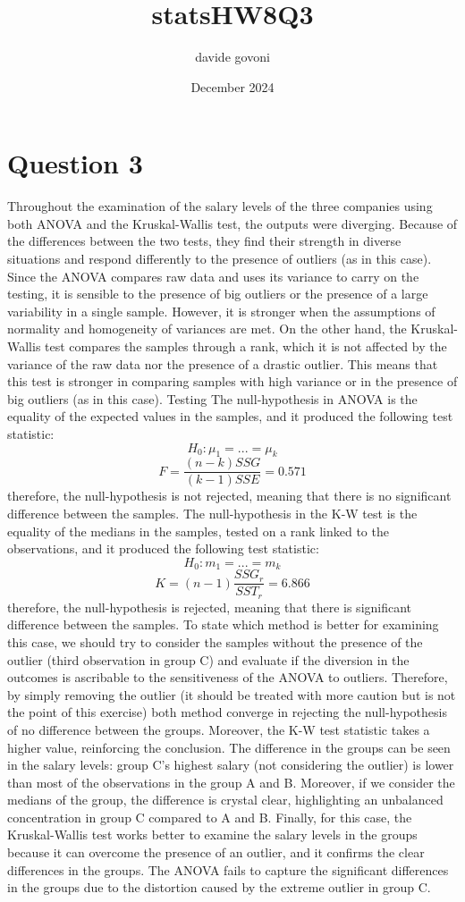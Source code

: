 \documentclass{article}
\title{statsHW8Q3}
\author{davide govoni}
\date{December 2024}
\begin{document}
\maketitle

\section{Question 3}
Throughout the examination of the salary levels of the three companies using both ANOVA and the Kruskal-Wallis test, the outputs were diverging. Because of the differences between the two tests, they find their strength in diverse situations and respond differently to the presence of outliers (as in this case). Since the ANOVA compares raw data and uses its variance to carry on the testing, it is sensible to the presence of big outliers or the presence of a large variability in a single sample. However, it is stronger when the assumptions of normality and homogeneity of variances are met. On the other hand, the Kruskal-Wallis test compares the samples through a rank, which it is not affected by the variance of the raw data nor the presence of a drastic outlier. This means that this test is stronger in comparing samples with high variance or in the presence of big outliers (as in this case). 
Testing
The null-hypothesis in ANOVA is the equality of the expected values in the samples, and it produced the following test statistic:
\[H_0: \mu_1=...=\mu_k\]
\[F = \frac{(n-k) SSG}{(k-1)SSE}=0.571\]
therefore, the null-hypothesis is not rejected, meaning that there is no significant difference between the samples.
The null-hypothesis in the K-W test is the equality of the medians in the samples, tested on a rank linked to the observations, and it produced the following test statistic:
\[H_0: m_1=...=m_k\]
\[K=(n-1)\frac{SSG_r}{SST_r}=6.866\]
therefore, the null-hypothesis is rejected, meaning that there is significant difference between the samples. 
To state which method is better for examining this case, we should try to consider the samples without the presence of the outlier (third observation in group C) and evaluate if the diversion in the outcomes is ascribable to the sensitiveness of the ANOVA to outliers. Therefore, by simply removing the outlier (it should be treated with more caution but is not the point of this exercise) both method converge in rejecting the null-hypothesis of no difference between the groups. Moreover, the K-W test statistic takes a higher value, reinforcing the conclusion. 
The difference in the groups can be seen in the salary levels: group C's highest salary (not considering the outlier) is lower than most of the observations in the group A and B. Moreover, if we consider the medians of the group, the difference is crystal clear, highlighting an unbalanced concentration in group C compared to A and B. 
Finally, for this case, the Kruskal-Wallis test works better to examine the salary levels in the groups because it can overcome the presence of an outlier, and it confirms the clear differences in the groups. The ANOVA fails to capture the significant differences in the groups due to the distortion caused by the extreme outlier in group C.
\end{document}
